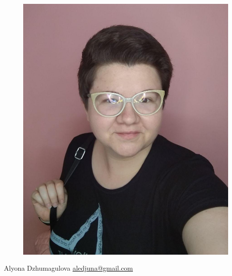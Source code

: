\documentclass[11pt,xcolor=x11names,compress]{beamer}
\renewcommand{\(}{\begin{columns}}
\renewcommand{\)}{\end{columns}}
\newcommand{\<}[1]{\begin{column}{#1}}
\renewcommand{\>}{\end{column}}
\begin{document}
\begin{frame}
\begin{columns}
\begin{column}{0.33\textwidth}
\begin{figure}
			\includegraphics[width=\textwidth]{Alyona.jpg}
		\end{figure}
		\centering
		Alyona Dzhumagulova \newline
		\url{aledjuna@gmail.com}
	\end{column}
	\end{columns}
\end{frame}
\end{document}
